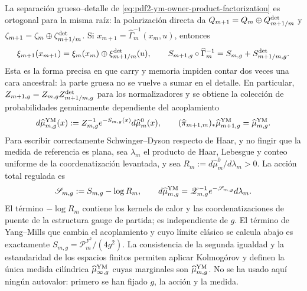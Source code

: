 La separación grueso--detalle de
\eqref{eq:pdf2-ym-owner-product-factorization} es ortogonal para la misma raíz:
la polarización directa da
$Q_{m+1}=Q_m\oplus Q_{m+1/m}^{\rm det}$ y
$\zeta_{m+1}=\zeta_m\oplus\zeta_{m+1/m}^{\rm det}$.
Si $x_{m+1}=\widehat\Gamma_m^{-1}(x_m,u)$, entonces
\begin{equation}\label{eq:pdf2-ym-action-cocycle}
 \xi_{m+1}(x_{m+1})
 =\xi_m(x_m)\oplus\xi_{m+1/m}^{\rm det}(u),
 \qquad
 S_{m+1,g}\circ\widehat\Gamma_m^{-1}
 =S_{m,g}+S_{m+1/m,g}^{\rm det}.
\end{equation}
Esta es la forma precisa en que carry y memoria impiden contar dos veces una cara
ancestral: la parte gruesa no se vuelve a sumar en el detalle. En particular,
$Z_{m+1,g}=Z_{m,g}Z_{m+1/m,g}^{\rm det}$ para los normalizadores y se obtiene la
colección de probabilidades genuinamente dependiente del acoplamiento
\begin{equation}\label{eq:pdf2-ym-gibbs-measure}
 d\widehat\mu_{m,g}^{\rm YM}(x)
 :=Z_{m,g}^{-1}e^{-S_{m,g}(x)}d\widehat\mu_m^0(x),
 \qquad
 (\widehat\pi_{m+1,m})_*\widehat\mu_{m+1,g}^{\rm YM}
 =\widehat\mu_{m,g}^{\rm YM}.
\end{equation}
Para escribir correctamente Schwinger--Dyson respecto de Haar, y no fingir que la
medida de referencia es plana, sea $\lambda_m$ el producto de Haar, Lebesgue y
conteo uniforme de la coordenatización levantada, y sea
$R_m:=d\widehat\mu_m^0/d\lambda_m>0$. La acción total regulada es
\begin{equation}\label{eq:pdf2-ym-total-regulated-action}
 \mathscr S_{m,g}:=S_{m,g}-\log R_m,
 \qquad
 d\widehat\mu_{m,g}^{\rm YM}
 =\mathscr Z_{m,g}^{-1}e^{-\mathscr S_{m,g}}d\lambda_m.
\end{equation}
El término $-\log R_m$ contiene los kernels de calor y las coordenatizaciones de puente de la
estructura gauge de partida; es independiente de $g$. El término de Yang--Mills que
cambia el acoplamiento y cuyo límite clásico se calcula abajo es exactamente
$S_{m,g}=\mathcal P_m^{F^2}/(4g^2)$.
La consistencia de la segunda igualdad y la estandaridad de los espacios finitos
permiten aplicar Kolmogórov y definen la única medida cilíndrica
$\widehat\mu_{\infty,g}^{\rm YM}$ cuyas marginales son
$\widehat\mu_{m,g}^{\rm YM}$.
No se ha usado aquí ningún autovalor: primero se han fijado $g$, la acción y
la medida.

